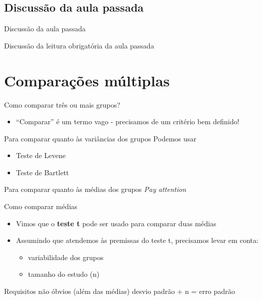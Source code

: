 \documentclass{beamer}
\begin{document}
\subsection{Discussão da aula passada}

\begin{frame}{Discussão da aula passada}
  \begin{block}{}
    Discussão da leitura obrigatória da aula passada
  \end{block}
\end{frame}

\section{Comparações múltiplas}

\begin{frame}{Como comparar três ou mais grupos?}
  \begin{itemize}
  \item ``Comparar'' é um termo vago - precisamos de um critério bem definido!
  \end{itemize}
  \begin{block}{Para comparar quanto às variâncias dos grupos}
    Podemos usar
    \begin{itemize}
    \item Teste de Levene
    \item Teste de Bartlett
    \end{itemize}
  \end{block}
  \begin{block}{Para comparar quanto às médias dos grupos}
    {\em Pay attention}
  \end{block}
\end{frame}
  
\begin{frame}[label=requisito]{Como comparar médias}
  \begin{itemize}
  \item Vimos que o {\bf teste t} pode ser usado para comparar duas médias
  \item Assumindo que atendemos às premissas do teste t, precisamos levar em conta:
    \begin{itemize}
    \item variabilidade dos grupos
    \item tamanho do estudo (n)
    \end{itemize}
  \end{itemize}
  \begin{block}{Requisitos não óbvios (além das médias)}
    desvio padrão + n = erro padrão
  \end{block}
\end{frame}
\end{document}
